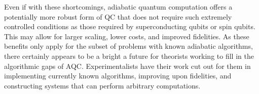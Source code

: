 \documentclass[%
 reprint,
 amsmath,amssymb,
 aps,
]{revtex4-1}
\begin{document}
	Even if with these shortcomings, adiabatic quantum computation offers a potentially more robust form of QC that does not require such extremely controlled conditions as those required by superconducting qubits or spin qubits. This may allow for larger scaling, lower costs, and improved fidelities. As these benefits only apply for the subset of problems with known adiabatic algorithms, there certainly appears to be a bright a future for theorists working to fill in the algorithmic gaps of AQC. Experimentalists have their work cut out for them in implementing currently known algorithms, improving upon fidelities, and constructing systems that can perform arbitrary computations.


\nocite{*} %
\end{document}
